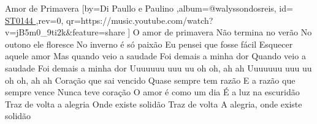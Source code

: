 \beginsong
{Amor de Primavera %
}[by={Di Paullo e Paulino %
},album={@walyssondosreis},
id={\href{https://music.youtube.com/watch?v=jB5m0_9ti2k&feature=share %
}{ ST0144 %
}},rev={0}, %
qr={https://music.youtube.com/watch?v=jB5m0_9ti2k&feature=share %
}]
\beginverse
O amor de primavera
Não termina no verão
No outono ele floresce
No inverno é só paixão
Eu pensei que fosse fácil
Esquecer aquele amor
Mas quando veio a saudade
Foi demais a minha dor
Quando veio a saudade
Foi demais a minha dor
\endverse
\beginchorus 
Uuuuuuu uuu uu oh oh, ah ah
Uuuuuuu uuu uu oh oh, ah ah
\endchorus
\beginverse
Coração que sai vencido
Quase sempre tem razão
E a razão que sempre vence
Nunca teve coração
O amor é como um dia
É a luz na escuridão
Traz de volta a alegria
Onde existe solidão
Traz de volta
A alegria, onde existe solidão
\endverse

